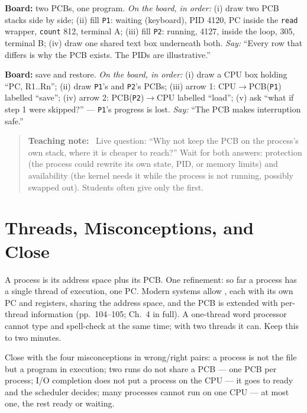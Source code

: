 \documentclass[11pt]{article}
\newenvironment{teachingaside}{\begin{quote}\small\color{primary-gold}\textbf{Teaching note:}\ }{\end{quote}}
\begin{document}
\textbf{Board:} two PCBs, one program. \emph{On the board, in order:} (i) draw two PCB stacks side by side; (ii) fill \texttt{P1}: waiting (keyboard), PID 4120, PC inside the \texttt{read} wrapper, \texttt{count} 812, terminal A; (iii) fill \texttt{P2}: running, 4127, inside the loop, 305, terminal B; (iv) draw one shared text box underneath both. \emph{Say:} ``Every row that differs is why the PCB exists. The PIDs are illustrative.''

\textbf{Board:} save and restore. \emph{On the board, in order:} (i) draw a CPU box holding ``PC, R1..Rn''; (ii) draw \texttt{P1}'s and \texttt{P2}'s PCBs; (iii) arrow 1: CPU$\to$PCB(\texttt{P1}) labelled ``save''; (iv) arrow 2: PCB(\texttt{P2})$\to$CPU labelled ``load''; (v) ask ``what if step 1 were skipped?'' --- \texttt{P1}'s progress is lost. \emph{Say:} ``The PCB makes interruption safe.''

\begin{teachingaside}
Live question: ``Why not keep the PCB on the process's own stack, where it is cheaper to reach?'' Wait for both answers: protection (the process could rewrite its own state, PID, or memory limits) and availability (the kernel needs it while the process is not running, possibly swapped out). Students often give only the first.
\end{teachingaside}

\section{Threads, Misconceptions, and Close}

A process is its address space plus its PCB. One refinement: so far a process has a single thread of execution, one PC. Modern systems allow , each with its own PC and registers, sharing the address space, and the PCB is extended with per-thread information (pp.~104--105; Ch.~4 in full). A one-thread word processor cannot type and spell-check at the same time; with two threads it can. Keep this to two minutes.

Close with the four misconceptions in wrong/right pairs: a process is not the file but a program in execution; two runs do not share a PCB --- one PCB per process; I/O completion does not put a process on the CPU --- it goes to ready and the scheduler decides; many processes cannot run on one CPU --- at most one, the rest ready or waiting.
\end{document}
